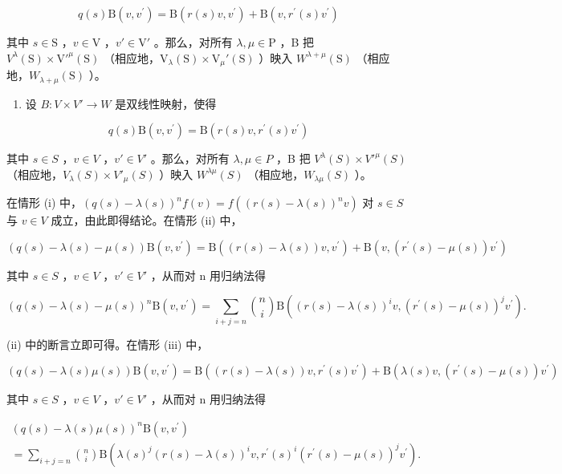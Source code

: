 \[
q (s) \mathrm{B} (v, v ^ {\prime}) = \mathrm{B} (r (s) v, v ^ {\prime}) + \mathrm{B} (v, r ^ {\prime} (s) v ^ {\prime})
\]

其中 \(s \in \mathrm{S}\) ，\(v \in \mathrm{V}\) ，\(v' \in \mathrm{V}'\) 。那么，对所有 \(\lambda, \mu \in \mathrm{P}\) ，B 把 \(V^{\lambda}(\mathrm{S}) \times \mathrm{V}'^{\mu}(\mathrm{S})\) （相应地，\(\mathrm{V}_{\lambda}(\mathrm{S}) \times \mathrm{V}_{\mu}'(\mathrm{S})\) ）映入 \(W^{\lambda + \mu}(\mathrm{S})\) （相应地，\(W_{\lambda + \mu}(\mathrm{S})\) ）。

\begin{enumerate}
\def\labelenumi{(\roman{enumi})}
\setcounter{enumi}{2}
\tightlist
\item
  设 \(B: V \times V' \to W\) 是双线性映射，使得
\end{enumerate}

\[
q (s) \mathrm{B} (v, v ^ {\prime}) = \mathrm{B} (r (s) v, r ^ {\prime} (s) v ^ {\prime})
\]

其中 \(s \in S\) ，\(v \in V\) ，\(v' \in V'\) 。那么，对所有 \(\lambda, \mu \in P\) ，B 把 \(V^{\lambda}(S) \times V'^{\mu}(S)\) （相应地，\(V_{\lambda}(S) \times V'_{\mu}(S)\) ）映入 \(W^{\lambda\mu}(S)\) （相应地，\(W_{\lambda\mu}(S)\) ）。

在情形 (i) 中，\((q(s) - \lambda(s))^n f(v) = f((r(s) - \lambda(s))^n v)\) 对 \(s \in S\) 与 \(v \in V\) 成立，由此即得结论。在情形 (ii) 中，

\[
(q (s) - \lambda (s) - \mu (s)) \mathrm{B} (v, v ^ {\prime}) = \mathrm{B} ((r (s) - \lambda (s)) v, v ^ {\prime}) + \mathrm{B} (v, (r ^ {\prime} (s) - \mu (s)) v ^ {\prime})
\]

其中 \(s \in S\) ，\(v \in V\) ，\(v' \in V'\) ，从而对 n 用归纳法得

\[
(q (s) - \lambda (s) - \mu (s)) ^ {n} \mathrm{B} (v, v ^ {\prime}) = \sum_ {i + j = n} \binom {n} {i} \mathrm{B} ((r (s) - \lambda (s)) ^ {i} v, (r ^ {\prime} (s) - \mu (s)) ^ {j} v ^ {\prime}).
\]

(ii) 中的断言立即可得。在情形 (iii) 中，

\[
(q (s) - \lambda (s) \mu (s)) \mathrm{B} (v, v ^ {\prime}) = \mathrm{B} ((r (s) - \lambda (s)) v, r ^ {\prime} (s) v ^ {\prime}) + \mathrm{B} (\lambda (s) v, (r ^ {\prime} (s) - \mu (s)) v ^ {\prime})
\]

其中 \(s \in S\) ，\(v \in V\) ，\(v' \in V'\) ，从而对 n 用归纳法得

\[
\begin{array}{l} (q (s) - \lambda (s) \mu (s)) ^ {n} \mathrm{B} (v, v ^ {\prime}) \\ = \sum_ {i + j = n} \binom {n} {i} \mathrm{B} (\lambda (s) ^ {j} (r (s) - \lambda (s)) ^ {i} v, r ^ {\prime} (s) ^ {i} (r ^ {\prime} (s) - \mu (s)) ^ {j} v ^ {\prime}). \end{array}
\]

